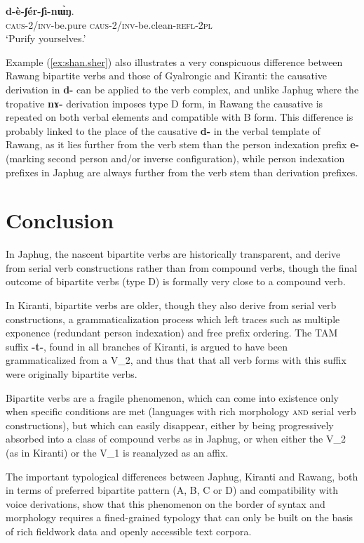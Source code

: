 \documentclass[11pt]{article}
\newcommand{\ipa}[1]{{\phon\textbf{#1}}}
\begin{document}
\begin{exe}
\ex \label{ex:shan.sher}
 \gll \ipa{d-è-ʃàn}	 \ipa{d-è-ʃér-ʃì-nɯ̀ŋ}. \\
\textsc{caus-2/inv}-be.pure	\textsc{caus-2/inv}-be.clean-\textsc{refl}-\textsc{2pl} \\
\glt `Purify yourselves.'
\end{exe}

Example (\ref{ex:shan.sher}) also illustrates a very conspicuous difference between Rawang bipartite verbs and those of Gyalrongic and Kiranti: the causative derivation in \ipa{d-} can be applied to the verb complex, and unlike Japhug where the tropative \ipa{nɤ-} derivation imposes type D form, in Rawang the causative is repeated on both verbal elements and compatible with B form. This difference is probably linked to the place of the causative \ipa{d-}  in the verbal template of Rawang, as it lies further from the verb stem than the person indexation prefix \ipa{e-} (marking second person and/or inverse configuration), while person indexation prefixes in Japhug are always further from the verb stem than derivation prefixes.

%

 
%
\section*{Conclusion}
In Japhug, the nascent bipartite verbs are historically transparent, and derive from serial verb constructions rather than from compound verbs, though the final outcome of bipartite verbs (type D) is formally very close to a compound verb.

In Kiranti, bipartite verbs are older, though they also derive from serial verb constructions, a grammaticalization process which left traces such as multiple exponence (redundant person indexation) and free prefix ordering. The TAM suffix \ipa{-t-}, found in all branches of Kiranti, is argued to have been grammaticalized from a V_2, and thus that that all verb forms with this suffix were originally bipartite verbs. 

Bipartite verbs are a fragile phenomenon, which can come into existence only when specific conditions are met (languages with rich morphology \textsc{and} serial verb constructions), but which can easily disappear, either by being progressively absorbed into a class of compound verbs as in Japhug, or when either the V_2 (as in Kiranti) or the V_1 is reanalyzed as an affix.

The important typological differences between Japhug, Kiranti and Rawang, both in terms of preferred bipartite pattern (A, B, C or D) and compatibility with voice derivations, show that this phenomenon on the border of syntax and morphology requires a fined-grained typology that can only be built on the basis of rich fieldwork data and openly accessible text corpora.




 
\end{document}
